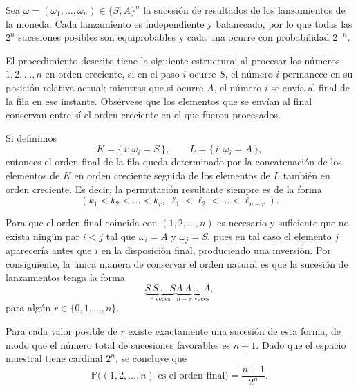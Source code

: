 \message{ !name(tarea2.tex)}\documentclass[12pt,a4paper]{article}
\begin{document}
    \begin{solucion}
        Sea $\omega=(\omega_1,\dots,\omega_n)\in\{S,A\}^n$ la sucesión de resultados de los lanzamientos de la moneda. 
        Cada lanzamiento es independiente y balanceado, por lo que todas las $2^n$ sucesiones posibles son equiprobables y cada una ocurre con probabilidad $2^{-n}$.

        El procedimiento descrito tiene la siguiente estructura: al procesar los números $1,2,\dots,n$ en orden creciente, si en el paso $i$ ocurre $S$, el número $i$ permanece en su posición relativa actual; mientras que si ocurre $A$, el número $i$ se envía al final de la fila en ese instante. Obsérvese que los elementos que se envían al final conservan entre sí el orden creciente en el que fueron procesados.

        Si definimos
        \[
        K=\{\, i : \omega_i=S \,\}, 
        \qquad 
        L=\{\, i : \omega_i=A \,\},
        \]
        entonces el orden final de la fila queda determinado por la concatenación de los elementos de $K$ en orden creciente seguida de los elementos de $L$ también en orden creciente. Es decir, la permutación resultante siempre es de la forma
        \[
        (k_1<k_2<\dots<k_r,\;\ell_1<\ell_2<\dots<\ell_{n-r}).
        \]

        Para que el orden final coincida con $(1,2,\dots,n)$ es necesario y suficiente que no exista ningún par $i<j$ tal que $\omega_i=A$ y $\omega_j=S$, pues en tal caso el elemento $j$ aparecería antes que $i$ en la disposición final, produciendo una inversión. Por consiguiente, la única manera de conservar el orden natural es que la sucesión de lanzamientos tenga la forma
        \[
        \underbrace{S\,S\,\dots\,S}_{r\text{ veces}}
        \underbrace{A\,A\,\dots\,A}_{n-r\text{ veces}},
        \]
        para algún $r\in\{0,1,\dots,n\}$.

        Para cada valor posible de $r$ existe exactamente una sucesión de esta forma, de modo que el número total de sucesiones favorables es $n+1$. Dado que el espacio muestral tiene cardinal $2^n$, se concluye que
        \[
        \mathbb{P}\big((1,2,\dots,n)\text{ es el orden final}\big)
        =
        \frac{n+1}{2^n}.
        \]
    \end{solucion}
\end{document}
